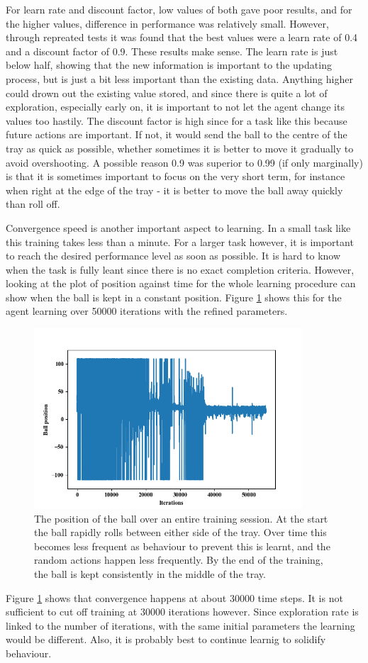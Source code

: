 \documentclass[12pt,a4paper]{article}
\begin{document}
For learn rate and discount factor, low values of both gave poor results, and for the higher values, difference in performance was relatively small. However, through repreated tests it was found that the best values were a learn rate of 0.4 and a discount factor of 0.9. These results make sense. The learn rate is just below half, showing that the new information is important to the updating process, but is just a bit less important than the existing data. Anything higher could drown out the existing value stored, and since there is quite a lot of exploration, especially early on, it is important to not let the agent change its values too hastily. The discount factor is high since for a task like this because future actions are important. If not, it would send the ball to the centre of the tray as quick as possible, whether sometimes it is better to move it gradually to avoid overshooting. A possible reason 0.9 was superior to 0.99 (if only marginally) is that it is sometimes important to focus on the very short term, for instance when right at the edge of the tray - it is better to move the ball away quickly than roll off.

Convergence speed is another important aspect to learning. In a small task like this training takes less than a minute. For a larger task however, it is important to reach the desired performance level as soon as possible. It is hard to know when the task is fully leant since there is no exact completion criteria. However, looking at the plot of position against time for the whole learning procedure can show when the ball is kept in a constant position. Figure \ref{f3} shows this for the agent learning over 50000 iterations with the refined parameters.
\begin{figure}[H]
	\centering
	\includegraphics[width=10cm]{153_small}
	\caption{The position of the ball over an entire training session. At the start the ball rapidly rolls between either side of the tray. Over time this becomes less frequent as behaviour to prevent this is learnt, and the random actions happen less frequently. By the end of the training, the ball is kept consistently in the middle of the tray.}
	\label{f3}
\end{figure}
Figure \ref{f3} shows that convergence happens at about 30000 time steps. It is not sufficient to cut off training at 30000 iterations however. Since exploration rate is linked to the number of iterations, with the same initial parameters the learning would be different. Also, it is probably best to continue learnig to solidify behaviour. 
\end{document}
